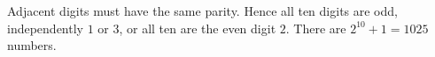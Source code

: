 Adjacent digits must have the same parity. Hence all ten digits are odd, independently $1$ or $3$, or all ten are the even digit $2$. There are $2^{10}+1=\boxed{1025}$ numbers.
